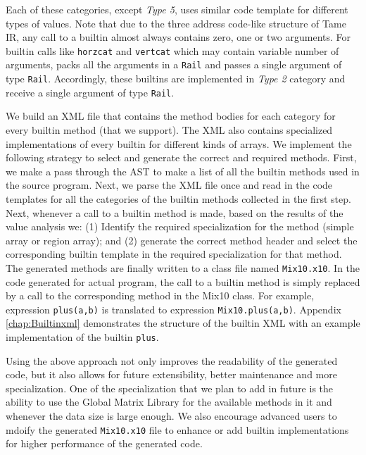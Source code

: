 Each of these categories, except \emph{Type 5}, uses similar code template for
different types of values. Note that due to the three address code-like
structure of Tame IR, any call to a builtin almost always contains zero, one or
two arguments. For builtin calls like \texttt{horzcat} and \texttt{vertcat}
which may contain variable number of arguments, \mixten packs all the arguments
in a \texttt{Rail} and passes a single argument of type \texttt{Rail}.
Accordingly, these builtins are implemented in \emph{Type 2} category and receive a
single argument of type \texttt{Rail}.

We build an XML file that contains the method bodies for each category for
every builtin method (that we support). The XML also contains specialized
implementations of every builtin for different kinds of arrays.  We implement
the following strategy to select and generate the correct and required methods.
First, we make a pass through the AST to make a list of all the builtin methods
used in the source \matlab program. Next, we parse the XML file once and read
in the \xten code templates for all the categories of the builtin methods
collected in the first step. Next, whenever a call to a builtin method is made,
based on the results of the value analysis we: (1) Identify the required
specialization for the method (simple array or region array); and (2) generate
the correct method header and select the corresponding builtin template in the
required specialization for that method.  The generated methods are finally
written to a \xten class file named \verb|Mix10.x10|. In the code generated for
actual \matlab program, the call to a builtin method is simply replaced by a
call to the corresponding method in the Mix10 class. For example, \matlab
expression \verb|plus(a,b)| is translated to \xten expression
\verb|Mix10.plus(a,b)|. Appendix \ref{chap:Builtinxml} demonstrates the
structure of the builtin XML with an example implementation of the builtin
\texttt{plus}. 

Using the above approach not only improves the readability of the generated
code, but it also allows for future extensibility, better maintenance and more
specialization. One of the specialization that we plan to add in future is the
ability to use the Global Matrix Library for the available methods in it and
whenever the data size is large enough. We also encourage advanced users to
mdoify the generated \texttt{Mix10.x10} file to enhance or add builtin
implementations for higher performance of the generated code. 

